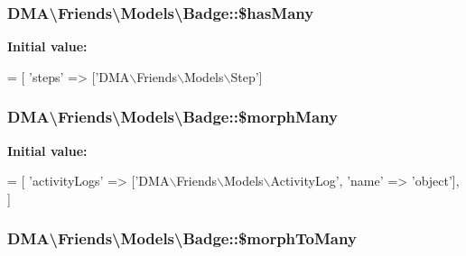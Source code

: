 \hypertarget{classDMA_1_1Friends_1_1Models_1_1Badge_a1b363de2d8c44cd12dff6bca90a6b212}{
\subsubsection[{\$has\-Many}]{\setlength{\rightskip}{0pt plus 5cm}D\-M\-A\textbackslash{}\-Friends\textbackslash{}\-Models\textbackslash{}\-Badge\-::\$has\-Many}}\label{classDMA_1_1Friends_1_1Models_1_1Badge_a1b363de2d8c44cd12dff6bca90a6b212}
{\bfseries Initial value\-:}
\begin{DoxyCode}
= [
        \textcolor{stringliteral}{'steps'} => [\textcolor{stringliteral}{'DMA\(\backslash\)Friends\(\backslash\)Models\(\backslash\)Step'}]
\end{DoxyCode}
\hypertarget{classDMA_1_1Friends_1_1Models_1_1Badge_a239fed984baad287f15badaaece428ff}{
\subsubsection[{\$morph\-Many}]{\setlength{\rightskip}{0pt plus 5cm}D\-M\-A\textbackslash{}\-Friends\textbackslash{}\-Models\textbackslash{}\-Badge\-::\$morph\-Many}}\label{classDMA_1_1Friends_1_1Models_1_1Badge_a239fed984baad287f15badaaece428ff}
{\bfseries Initial value\-:}
\begin{DoxyCode}
= [
        \textcolor{stringliteral}{'activityLogs'}  => [\textcolor{stringliteral}{'DMA\(\backslash\)Friends\(\backslash\)Models\(\backslash\)ActivityLog'}, \textcolor{stringliteral}{'name'} => \textcolor{stringliteral}{'object'}],
    ]
\end{DoxyCode}
\hypertarget{classDMA_1_1Friends_1_1Models_1_1Badge_a2efb4ca933422dfb4ca416676d73cad0}{
\subsubsection[{\$morph\-To\-Many}]{\setlength{\rightskip}{0pt plus 5cm}D\-M\-A\textbackslash{}\-Friends\textbackslash{}\-Models\textbackslash{}\-Badge\-::\$morph\-To\-Many}}\label{classDMA_1_1Friends_1_1Models_1_1Badge_a2efb4ca933422dfb4ca416676d73cad0}
